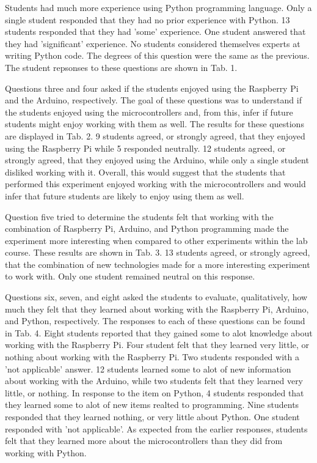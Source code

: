 Students had much more experience using Python programming language.
Only a single student responded that they had no prior experience with Python.
13 students responded that they had 'some' experience.
One student answered that they had 'significant' experience.
No students considered themselves experts at writing Python code.
The degrees of this question were the same as the previous.
The student repsonses to these questions are shown in Tab. 1.



Questions three and four asked if the students enjoyed using the Raspberry Pi and the Arduino, respectively.
The goal of these questions was to understand if the students enjoyed using the microcontrollers and, from this, infer if future students might enjoy working with them as well.
The results for these questions are displayed in Tab. 2.
9 students agreed, or strongly agreed, that they enjoyed using the Raspberry Pi while 5 responded neutrally.
12 students agreed, or strongly agreed, that they enjoyed using the Arduino, while only a single student disliked working with it.
Overall, this would suggest that the students that performed this experiment enjoyed working with the microcontrollers and would infer that future students are likely to enjoy using them as well.

Question five tried to determine the students felt that working with the combination of Raspberry Pi, Arduino, and Python programming made the experiment more interesting when compared to other experiments within the lab course.
These results are shown in Tab. 3.
13 students agreed, or strongly agreed, that the combination of new technologies made for a more interesting experiment to work with.
Only one student remained neutral on this response.

Questions six, seven, and eight asked the students to evaluate, qualitatively, how much they felt that they learned about working with the Raspberry Pi, Arduino, and Python, respectively.
The responses to each of these questions can be found in Tab. 4.
Eight students reported that they gained some to alot knowledge about working with the Raspberry Pi.
Four student felt that they learned very little, or nothing about working with the Raspberry Pi.
Two students responded with a 'not applicable' answer.
12 students learned some to alot of new information about working with the Arduino, while two students felt that they learned very little, or nothing.
In response to the item on Python, 4 students responded that they learned some to alot of new items realted to programming.
Nine students responded that they learned nothing, or very little about Python.
One student responded with 'not applicable'.
As expected from the earlier responses, students felt that they learned more about the microcontrollers than they did from working with Python.


